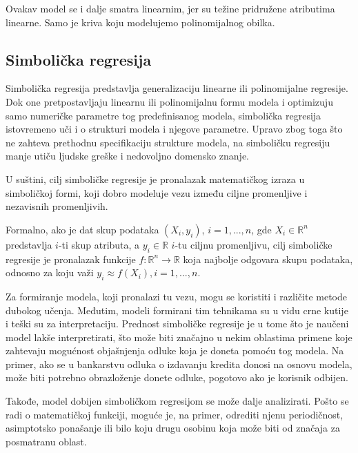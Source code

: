 \documentclass[main.tex]{subfiles}
\begin{document}
Ovakav model se i dalje smatra linearnim, jer su težine pridružene atributima linearne. Samo je kriva koju modelujemo polinomijalnog obilka.

\subsection{Simbolička regresija}
\label{sec:SR}

Simbolička regresija predstavlja generalizaciju linearne ili polinomijalne regresije. Dok one pretpostavljaju linearnu ili polinomijalnu formu modela i optimizuju samo numeričke parametre tog predefinisanog modela, simbolička regresija istovremeno uči i o strukturi modela i njegove parametre. Upravo zbog toga što ne zahteva prethodnu specifikaciju strukture modela, na simboličku regresiju manje utiču ljudske greške i nedovoljno domensko znanje.

U suštini, cilj simboličke regresije je pronalazak matematičkog izraza u simboličkoj formi, koji dobro modeluje vezu između ciljne promenljive i nezavisnih promenljivih. 


Formalno, ako je dat skup podataka $(X_i, y_i)$, $i=1,...,n$, gde $X_i \in \mathbb{R}^{n}$ predstavlja $i$-ti skup atributa, a $y_i \in \mathbb{R}$ $i$-tu ciljnu promenljivu, cilj simboličke regresije je pronalazak funkcije $f: \mathbb{R}^{n} \rightarrow \mathbb{R}$ koja najbolje odgovara skupu podataka, odnosno za koju važi $y_i \approx f(X_i), i=1,...,n$.

Za formiranje modela, koji pronalazi tu vezu, mogu se koristiti i različite metode dubokog učenja. Međutim, modeli formirani tim tehnikama su u vidu crne kutije i teški su za interpretaciju. Prednost simboličke regresije je u tome što je naučeni model lakše interpretirati, što može biti značajno u nekim oblastima primene koje zahtevaju mogućnost objašnjenja odluke koja je doneta pomoću tog modela. Na primer, ako se u bankarstvu odluka o izdavanju kredita donosi na osnovu modela, može biti potrebno obrazloženje donete odluke, pogotovo ako je korisnik odbijen. 

Takođe, model dobijen simboličkom regresijom se može dalje analizirati. Pošto se radi o matematičkoj funkciji, moguće je, na primer, odrediti njenu periodičnost, asimptotsko ponašanje ili bilo koju drugu osobinu koja može biti od značaja za posmatranu oblast.
\end{document}
